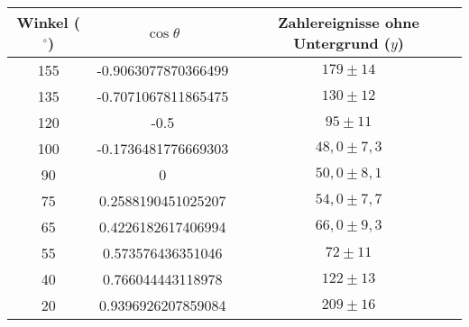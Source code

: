 \documentclass[prb,12pt]{revtex4-2}
\theoremstyle{definition}
\theoremstyle{definition}
\begin{document}
\begin{center}
	\begin{tabular}{ccc}
	\toprule
	\textbf{Winkel ($^\circ$)} & $\cos\theta$ & \textbf{Zahlereignisse ohne Untergrund ($y$)}\\\midrule
	155 & -0.9063077870366499 & $179\pm  14$ \\\midrule
	135 & -0.7071067811865475 & $130 \pm 12$ \\\midrule
	120 & -0.5 & $95 \pm 11$ \\\midrule
	100 & -0.1736481776669303 & $48,0 \pm 7,3$ \\\midrule
	90 & 0 & $50,0 \pm 8,1$ \\\midrule
	75 & 0.2588190451025207& $54,0 \pm 7,7$ \\\midrule
	65 & 0.4226182617406994 & $66,0 \pm 9,3$ \\\midrule
	55 &0.573576436351046 &  $72 \pm 11$ \\\midrule
	40 & 0.766044443118978& $122 \pm 13$ \\\midrule
	20 & 0.9396926207859084 & $209 \pm 16$ \\\bottomrule
\end{tabular}
\end{center}
\end{document}
